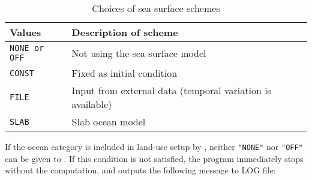 \begin{table}[h]
\begin{center}
  \caption{Choices of sea surface schemes}
  \label{tab:nml_ocean}
  \begin{tabularx}{150mm}{lX} \hline
    \rowcolor[gray]{0.9}  Values & Description of scheme \\ \hline
      \verb|NONE or OFF| & Not using the sea surface model         \\
      \verb|CONST|        & Fixed as initial condition           \\
      \verb|FILE|         & Input from external data (temporal variation is available) \\
      \verb|SLAB|         & Slab ocean model                   \\
    \hline
  \end{tabularx}
\end{center}
\end{table}

If the ocean category is included in land-use setup by , neither \verb|"NONE"| nor \verb|"OFF"| can be given to . If this condition is not satisfied, the program immediately stops without the computation, and outputs the following message to LOG file:

